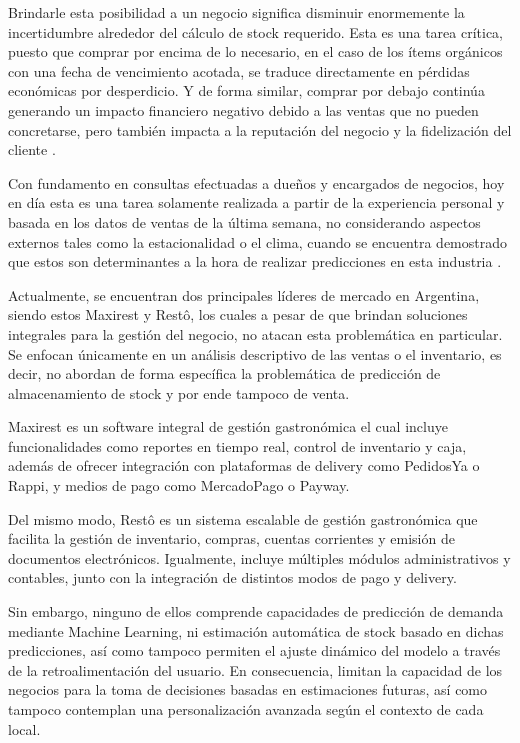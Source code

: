 Brindarle esta posibilidad a un negocio significa disminuir enormemente la incertidumbre alrededor del cálculo de stock requerido. Esta es una tarea crítica, puesto que comprar por encima de lo necesario, en el caso de los ítems orgánicos con una fecha de vencimiento acotada, se traduce directamente en pérdidas económicas por desperdicio. Y de forma similar, comprar por debajo continúa generando un impacto financiero negativo debido a las ventas que no pueden concretarse, pero también impacta a la reputación del negocio y la fidelización del cliente \parencite{agrawal2023predictive}.

Con fundamento en consultas efectuadas a dueños y encargados de negocios, hoy en día esta es una tarea solamente realizada a partir de la experiencia personal y basada en los datos de ventas de la última semana, no considerando aspectos externos tales como la estacionalidad o el clima, cuando se encuentra demostrado que estos son determinantes a la hora de realizar predicciones en esta industria \parencite{tanizaki2019forecasting}.

Actualmente, se encuentran dos principales líderes de mercado en Argentina, siendo estos Maxirest y Restô, los cuales a pesar de que brindan soluciones integrales para la gestión del negocio, no atacan esta problemática en particular. Se enfocan únicamente en un análisis descriptivo de las ventas o el inventario, es decir, no abordan de forma específica la problemática de predicción de almacenamiento de stock y por ende tampoco de venta.  

Maxirest es un software integral de gestión gastronómica el cual incluye funcionalidades como reportes en tiempo real, control de inventario y caja, además de ofrecer integración con plataformas de delivery como PedidosYa o Rappi, y medios de pago como MercadoPago o Payway.  

Del mismo modo, Restô es un sistema escalable de gestión gastronómica que facilita la gestión de inventario, compras, cuentas corrientes y emisión de documentos electrónicos. Igualmente, incluye múltiples módulos administrativos y contables, junto con la integración de distintos modos de pago y delivery. 

Sin embargo, ninguno de ellos comprende capacidades de predicción de demanda mediante Machine Learning, ni estimación automática de stock basado en dichas predicciones, así como tampoco permiten el ajuste dinámico del modelo a través de la retroalimentación del usuario. En consecuencia, limitan la capacidad de los negocios para la toma de decisiones basadas en estimaciones futuras, así como tampoco contemplan una personalización avanzada según el contexto de cada local.  

